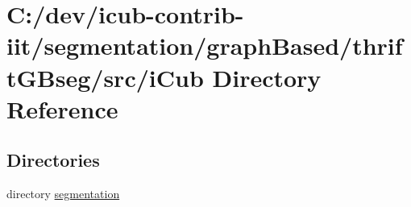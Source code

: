 \section{C\+:/dev/icub-\/contrib-\/iit/segmentation/graph\+Based/thrift\+G\+Bseg/src/i\+Cub Directory Reference}
\label{dir_3e29d0d99a5144b4df7d1014c756c8f1}
\subsection*{Directories}
\begin{DoxyCompactItemize}
\item 
directory \hyperlink{dir_496ea1ba30e91b64f5187ecd0adbcbfd}{segmentation}
\end{DoxyCompactItemize}
